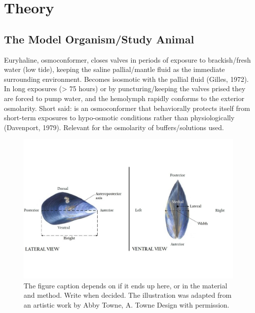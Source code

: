 \chapter{Theory}
\section{The Model Organism/Study Animal}
Euryhaline, osmoconformer, closes valves in periods of exposure to brackish/fresh water (low tide), keeping the saline pallial/mantle fluid as the immediate surrounding environment. Becomes isosmotic with the pallial fluid (Gilles, 1972). In long exposures (> 75 hours) or by puncturing/keeping the valves prised they are forced to pump water, and the hemolymph rapidly conforms to the exterior osmolarity. Short said: is an osmoconformer that behaviorally protects itself from short-term exposures to hypo-osmotic conditions rather than physiologically (Davenport, 1979). Relevant for the osmolarity of buffers/solutions used.

\begin{figure}[H]
    \centering
    \includegraphics[width=\textwidth]{figures/Anatomy/M_edulis_anatomical_axis_lateral.jpg}
    \caption{The figure caption depends on if it ends up here, or in the material and method. Write when decided. The illustration was adapted from an artistic work by Abby Towne, A. Towne Design with permission.}
    \label{fig:anatomical_axis}
\end{figure}



